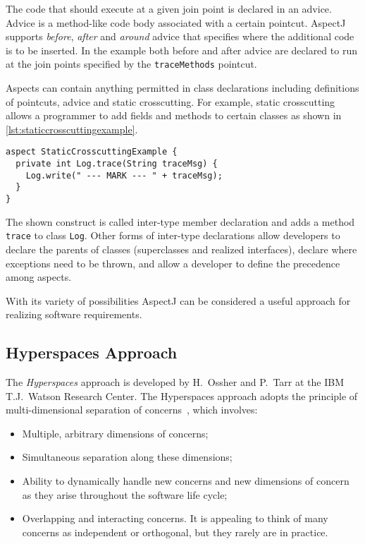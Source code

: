 The code that should execute at a given join point is declared in an advice.
Advice is a method-like code body associated with a certain pointcut.
AspectJ supports \emph{before}, \emph{after} and \emph{around} advice that specifies where the additional code is to be inserted.
In the example both before and after advice are declared to run at the join points specified by the \lstinline|traceMethods| pointcut.

Aspects can contain anything permitted in class declarations including definitions of pointcuts, advice and static crosscutting.
For example, static crosscutting allows a programmer to add fields and methods to certain classes as shown in \autoref{lst:staticcrosscuttingexample}.

\begin{lstlisting}[language={[AspectJ]Java},style=floatlisting,%
                   caption={Example of static crosscutting in AspectJ},%
                   label={lst:staticcrosscuttingexample},floatplacement=htbp]
aspect StaticCrosscuttingExample {
  private int Log.trace(String traceMsg) {
    Log.write(" --- MARK --- " + traceMsg);
  }
}
\end{lstlisting}

The shown construct is called inter-type member declaration and adds a method \lstinline|trace| to class \lstinline|Log|.
Other forms of inter-type declarations allow developers to declare the parents of classes (superclasses and realized interfaces), declare where exceptions need to be thrown, and allow a developer to define the precedence among aspects.

With its variety of possibilities AspectJ can be considered a useful approach for realizing software requirements.

\subsection{Hyperspaces Approach}

The \emph{Hyperspaces} approach is developed by H.~Ossher and P.~Tarr at the IBM T.J.~Watson Research Center.
The Hyperspaces approach adopts the principle of multi-dimensional separation of concerns~\cite{ossher:sact01}, which involves:
\begin{itemize}[noitemsep]
  \item Multiple, arbitrary dimensions of concerns;
  \item Simultaneous separation along these dimensions;
  \item Ability to dynamically handle new concerns and new dimensions of concern as they arise throughout the software life cycle;
  \item Overlapping and interacting concerns. It is appealing to think of many concerns as independent or orthogonal, but they rarely are in practice.
\end{itemize}

